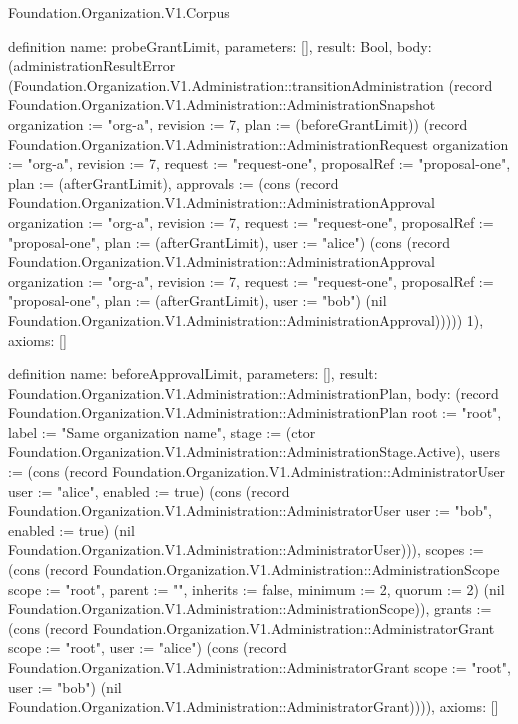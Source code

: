 \begin{lexlean}{Foundation.Organization.V1.Corpus}
\begin{semanticmodule}
definition{
  name: probeGrantLimit,
  parameters: [],
  result: Bool,
  body: (administrationResultError (Foundation.Organization.V1.Administration::transitionAdministration (record Foundation.Organization.V1.Administration::AdministrationSnapshot {organization := "org-a", revision := 7, plan := (beforeGrantLimit)}) (record Foundation.Organization.V1.Administration::AdministrationRequest {organization := "org-a", revision := 7, request := "request-one", proposalRef := "proposal-one", plan := (afterGrantLimit), approvals := (cons (record Foundation.Organization.V1.Administration::AdministrationApproval {organization := "org-a", revision := 7, request := "request-one", proposalRef := "proposal-one", plan := (afterGrantLimit), user := "alice"}) (cons (record Foundation.Organization.V1.Administration::AdministrationApproval {organization := "org-a", revision := 7, request := "request-one", proposalRef := "proposal-one", plan := (afterGrantLimit), user := "bob"}) (nil Foundation.Organization.V1.Administration::AdministrationApproval)))})) 1),
  axioms: []
}

definition{
  name: beforeApprovalLimit,
  parameters: [],
  result: Foundation.Organization.V1.Administration::AdministrationPlan,
  body: (record Foundation.Organization.V1.Administration::AdministrationPlan {root := "root", label := "Same organization name", stage := (ctor Foundation.Organization.V1.Administration::AdministrationStage.Active), users := (cons (record Foundation.Organization.V1.Administration::AdministratorUser {user := "alice", enabled := true}) (cons (record Foundation.Organization.V1.Administration::AdministratorUser {user := "bob", enabled := true}) (nil Foundation.Organization.V1.Administration::AdministratorUser))), scopes := (cons (record Foundation.Organization.V1.Administration::AdministrationScope {scope := "root", parent := "", inherits := false, minimum := 2, quorum := 2}) (nil Foundation.Organization.V1.Administration::AdministrationScope)), grants := (cons (record Foundation.Organization.V1.Administration::AdministratorGrant {scope := "root", user := "alice"}) (cons (record Foundation.Organization.V1.Administration::AdministratorGrant {scope := "root", user := "bob"}) (nil Foundation.Organization.V1.Administration::AdministratorGrant)))}),
  axioms: []
}


\end{semanticmodule}
\end{lexlean}
